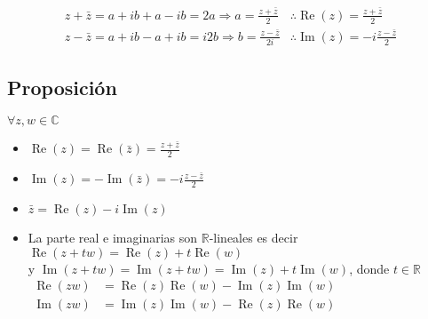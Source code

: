 \[
 \begin{aligned}
  z+\bar{z}=a+i b+a-i b=2 a \Rightarrow a=\frac{z+\bar{z}}{2} & \therefore \operatorname{Re}(z)=\frac{z+\bar{z}}{2} \\
  z-\bar{z}=a+i b-a+i b=i 2 b \Rightarrow b=\frac{z-\bar{z}}{2 i} & \therefore \operatorname{Im}(z)=-i \frac{z-\bar{z}}{2}
 \end{aligned}
\]

\subsection{Proposición}
$\forall z, w \in \mathbb{C}$
\begin{itemize}
  \item $\operatorname{Re}(z)=\operatorname{Re}(\bar{z})=\frac{z+\bar{z}}{2}$ 
  \item $\operatorname{Im}(z)=-\operatorname{Im}(\bar{z})=-i \frac{z-\bar{z}}{2}$ 
  \item $\bar{z}=\operatorname{Re}(z)-i \operatorname{Im}(z)$ 
  \item La parte real e imaginarias son $\mathbb{R}$-lineales es decir $\operatorname{Re}(z+tw)=\operatorname{Re}(z)+t \operatorname{Re}(w)$\\
  y $\operatorname{Im}(z+t w)=\operatorname{Im}(z+t w)=\operatorname{Im}(z)+t \operatorname{Im}(w)$, donde  $t \in \mathbb{R}$\\
  $\begin{aligned}
       \operatorname{Re}(z w)&=\operatorname{Re}(z) \operatorname{Re}(w)-\operatorname{Im}(z) \operatorname{Im}(w) \\
       \operatorname{Im}(z w)&=\operatorname{Im}(z)\operatorname{Im}(w)-\operatorname{Re}(z) \operatorname{Re}(w)
   \end{aligned}$
\end{itemize}
